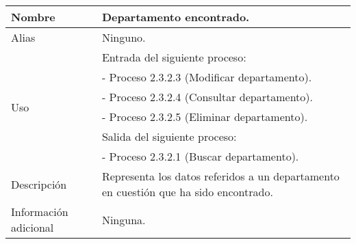 \begin{center}
  \begin{tabular}{| l | p{9cm} |}
    \hline
    Nombre & \textbf{Departamento encontrado}.\\
    \hline
    Alias & Ninguno.\\
    \hline
    \multirow{6}{*}{Uso} & Entrada del siguiente proceso:\\
                         & - Proceso 2.3.2.3 (Modificar departamento).\\
                         & - Proceso 2.3.2.4 (Consultar departamento).\\
                         & - Proceso 2.3.2.5 (Eliminar departamento).\\
                         & Salida del siguiente proceso:\\
                         & - Proceso 2.3.2.1 (Buscar departamento).\\
    \hline
    Descripción & Representa los datos referidos a un departamento en cuestión
                  que ha sido encontrado.\\
    \hline
    Información adicional & Ninguna.\\
    \hline
  \end{tabular}
\end{center}
